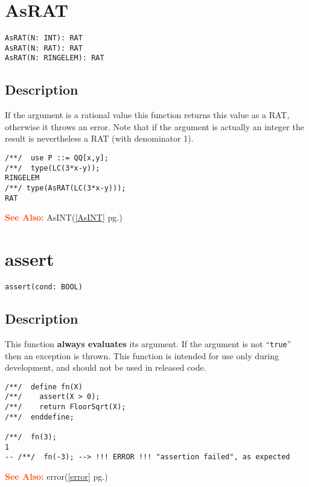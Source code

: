 \documentclass[a4paper]{mybook}
\newenvironment{command}{}{} %
\newcommand\SeeAlso{\par\textcolor{OrangeRed}{\textbf{\large See Also: }}}
\begin{document}
\section{AsRAT}
\label{AsRAT}
\begin{command} %


\begin{Verbatim}[label=syntax, rulecolor=\color{MidnightBlue},
frame=single]
AsRAT(N: INT): RAT
AsRAT(N: RAT): RAT
AsRAT(N: RINGELEM): RAT
\end{Verbatim}


\subsection*{Description}

If the argument is a rational value this function returns this value as
a RAT, otherwise it throws an error.  Note that if the argument is
actually an integer the result is nevertheless a RAT (with denominator 1).
\begin{Verbatim}[label=example, rulecolor=\color{PineGreen}, frame=single]
/**/  use P ::= QQ[x,y];
/**/  type(LC(3*x-y));
RINGELEM
/**/ type(AsRAT(LC(3*x-y)));
RAT
\end{Verbatim}


\SeeAlso %
  AsINT(\ref{AsINT} pg.\pageref{AsINT})
\end{command} %

\section{assert}
\label{assert}
\begin{command} %


\begin{Verbatim}[label=syntax, rulecolor=\color{MidnightBlue},
frame=single]
assert(cond: BOOL)
\end{Verbatim}


\subsection*{Description}

This function \textbf{always evaluates} its argument.  If the argument is
not ``\verb&true&'' then an exception is thrown.  This function is
intended for use only during development, and should not be used in
released code.
\begin{Verbatim}[label=example, rulecolor=\color{PineGreen}, frame=single]
/**/  define fn(X)
/**/    assert(X > 0);
/**/    return FloorSqrt(X);
/**/  enddefine;

/**/  fn(3);
1
-- /**/  fn(-3); --> !!! ERROR !!! "assertion failed", as expected
\end{Verbatim}


\SeeAlso %
  error(\ref{error} pg.\pageref{error})
\end{command} %
\end{document}
